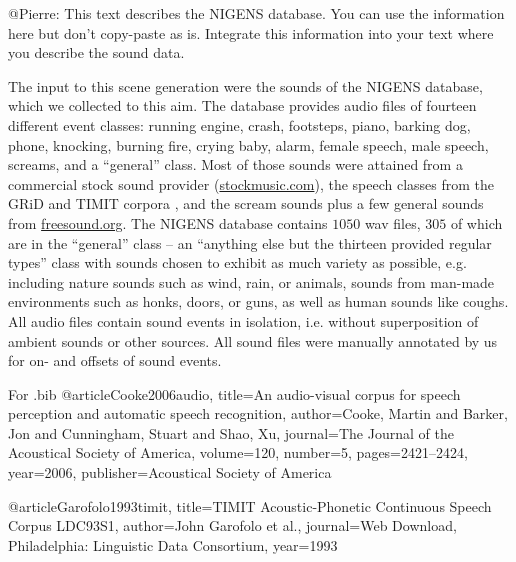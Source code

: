 @Pierre: This text describes the NIGENS database. You can use the information here but don't copy-paste as is. Integrate this information into your text where you describe the sound data.

The input to this scene generation were the sounds of the NIGENS database, which we collected to this aim. The database provides audio files of fourteen different event classes: running engine, crash, footsteps, piano, barking dog, phone, knocking, burning fire, crying baby, alarm, female speech, male speech, screams, and a ``general'' class. Most of those sounds were attained from a commercial stock sound provider (\url{stockmusic.com}), the speech classes from the GRiD and TIMIT corpora \cite{Cooke2006audio, Garofolo1993timit}, and the scream sounds plus a few general sounds from \url{freesound.org}. The NIGENS database contains $1050$ wav files, $305$ of which are in the ``general'' class -- an ``anything else but the thirteen provided regular types'' class with sounds chosen to exhibit as much variety as possible, e.g. including nature sounds such as wind, rain, or animals, sounds from man-made environments such as honks, doors, or guns, as well as human sounds like coughs. All audio files contain sound events in isolation, i.e. without superposition of ambient sounds or other sources. All sound files were manually annotated by us for on- and offsets of sound events. 

For .bib
@article{Cooke2006audio,
  title={An audio-visual corpus for speech perception and automatic speech recognition},
  author={Cooke, Martin and Barker, Jon and Cunningham, Stuart and Shao, Xu},
  journal={The Journal of the Acoustical Society of America},
  volume={120},
  number={5},
  pages={2421--2424},
  year={2006},
  publisher={Acoustical Society of America}
}

@article{Garofolo1993timit,
  title={TIMIT Acoustic-Phonetic Continuous Speech Corpus LDC93S1},
  author={John Garofolo et al.},
  journal={Web Download, Philadelphia: Linguistic Data Consortium},
  year={1993}
}